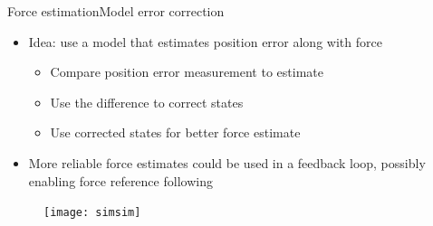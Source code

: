 \begin{frame}{Force estimation}{Model error correction}
\begin{itemize}
\item Idea: use a model that estimates position error along with force
\begin{itemize}
\item Compare position error measurement to estimate
\item Use the difference to correct states 
\item Use corrected states for better force estimate
\end{itemize}
\item More reliable force estimates could be used in a feedback loop, possibly enabling force reference following
\end{itemize}
\begin{figure}
\centering
\texttt{[image: simsim]}
\end{figure}
\end{frame}

